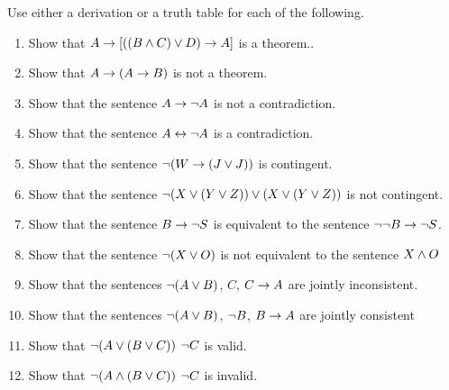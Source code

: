 \practiceproblems
\noindent\problempart Use either a derivation or a truth table for each of the following. 
\begin{enumerate}%
\item Show that $A \rightarrow [((B \wedge C) \vee D) \rightarrow A]$ is a theorem..
\item Show that $A \rightarrow (A \rightarrow B)$ is not a theorem.
\item Show that the sentence $A \rightarrow \neg{A}$ is not a contradiction.
\item Show that the sentence $A \leftrightarrow \neg A$ is a contradiction. 
\item Show that the sentence $ \neg (W \rightarrow (J \vee J)) $ is contingent.
\item Show that the sentence $ \neg(X \vee (Y \vee Z)) \vee (X \vee (Y \vee Z))$ is not contingent.
 \item Show that the sentence $B \rightarrow \neg S$ is equivalent to the sentence $\neg \neg B \rightarrow \neg S$.
\item Show that the sentence $ \neg (X \vee O) $ is not equivalent to the sentence $X \wedge O$
\item Show that the sentences $\neg(A \vee B)$, $C$, $C \rightarrow A$  are jointly inconsistent.
\item Show that the sentences $\neg(A \vee B)$, $\neg{B}$, $B \rightarrow A$ are jointly consistent
\item Show that $\neg(A \vee (B \vee C)) $ \therefore $ \neg{C}$ is valid.
\item Show that $\neg(A \wedge (B \vee C))$ \therefore $ \neg{C}$ is invalid. 
\end{enumerate}


